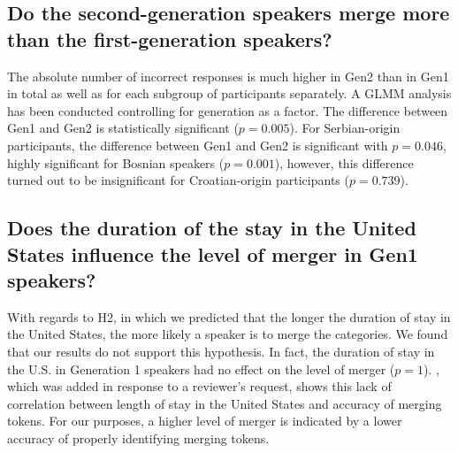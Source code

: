 \documentclass[output=paper,
modfonts,
newtxmath,
hidelinks,
]{langscibook}
\begin{document}
\subsection{Do the second-generation speakers merge more than the first-generation speakers?}\label{sec:mihajlovic:5.2}

The absolute number of incorrect responses is much higher in Gen2 than in Gen1 in total as well as for each subgroup of participants separately. A GLMM analysis has been conducted controlling for generation as a factor. The difference between Gen1 and Gen2 is statistically significant ($p=0.005$). For Serbian-origin participants, the difference between Gen1 and Gen2 is significant with $p=0.046$, highly significant for Bosnian speakers ($p=0.001$), however, this difference turned out to be insignificant for Croatian-origin participants ($p=0.739$).


\subsection{Does the duration of the stay in the United States influence the level of merger in Gen1 speakers?}\label{sec:mihajlovic:5.3}

With regards to H2, in which we predicted that the longer the duration of stay in the United States, the more likely a speaker is to merge the categories. We found that our results do not support this hypothesis. In fact, the duration of stay in the U.S. in Generation 1 speakers had no effect on the level of merger ($p=1$). , which was added in response to a reviewer’s request, shows this lack of correlation between length of stay in the United States and accuracy of merging tokens. For our purposes, a higher level of merger is indicated by a lower accuracy of properly identifying merging tokens.
\end{document}
